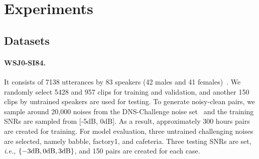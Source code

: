 \documentclass{article}
\begin{document}
{\section{Experiments}
\label{experiments}
\subsection{Datasets}
\paragraph{WSJ0-SI84.} It consists of 7138 utterances by 83 speakers (42 males and 41 females)~{\cite{paul1992design}}. We randomly select 5428 and 957 clips for training and validation, and another 150 clips by untrained speakers are used for testing. To generate noisy-clean pairs, we sample around 20,000 noises from the DNS-Challenge noise set~{\cite{reddy2020interspeech}} and the training SNRs are sampled from [-5\rm{dB}, 0\rm{dB}]. As a result, approximately 300 hours pairs are created for training. For model evaluation, three untrained challenging noises are selected, namely babble, factory1, and cafeteria. Three testing SNRs are set, \emph{i.e.}, $\left\{-3\rm{dB}, 0\rm{dB}, 3\rm{dB}\right\}$, and 150 pairs are created for each case.
}
\end{document}
